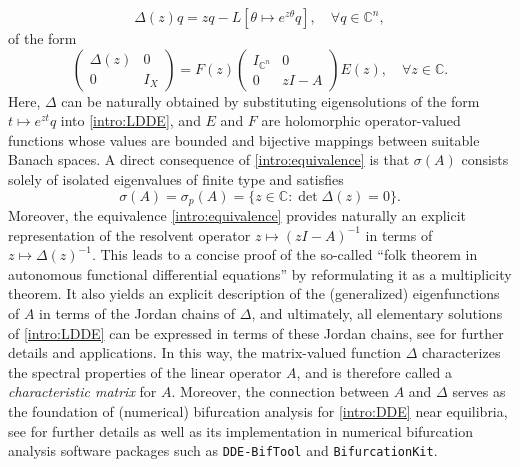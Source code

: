 \documentclass[english]{myarticle}
\begin{document}
\begin{sloppypar}
\begin{equation}
    \Delta(z)q = zq - L[\theta  \mapsto e^{z \theta}q], \quad \forall q \in \mathbb{C}^n,
\end{equation}
of the form
\begin{equation} \label{intro:equivalence}
        \begin{pmatrix}
            \Delta(z) & 0 \\
            0 & I_{X}
        \end{pmatrix}
        =
        F(z)
        \begin{pmatrix}
            I_{\mathbb{C}^n}& 0 \\
            0 & zI - A
        \end{pmatrix}
        E(z), \quad \forall z \in \mathbb{C}.
\end{equation}
Here, $\Delta$ can be naturally obtained by substituting eigensolutions of the form $t \mapsto e^{zt}q$ into \eqref{intro:LDDE}, and $E$ and $F$ are holomorphic operator-valued functions whose values are bounded and bijective mappings between suitable Banach spaces. A direct consequence of \eqref{intro:equivalence} is that $\sigma(A)$ consists solely of isolated eigenvalues of finite type and satisfies
\begin{equation} \label{intro:spectraDDE}
    \sigma(A) = \sigma_p(A) = \{ z \in \mathbb{C} : \det \Delta(z) = 0 \}.
\end{equation}
Moreover, the equivalence \eqref{intro:equivalence} provides naturally an explicit representation of the resolvent operator $z \mapsto (zI - A)^{-1}$ in terms of $z \mapsto \Delta(z)^{-1}$. This leads to a concise proof of the so-called ``folk theorem in autonomous functional differential equations'' by reformulating it as a multiplicity theorem. It also yields an explicit description of the (generalized) eigenfunctions of $A$ in terms of the Jordan chains of $\Delta$, and ultimately, all elementary solutions of \eqref{intro:LDDE} can be expressed in terms of these Jordan chains, see \cite{Kaashoek1992,Hale1993,Diekmann1995} for further details and applications. In this way, the matrix-valued function $\Delta$ characterizes the spectral properties of the linear operator $A$, and is therefore called a \emph{characteristic matrix} for $A$. Moreover, the connection between $A$ and $\Delta$ serves as the foundation of (numerical) bifurcation analysis for \eqref{intro:DDE} near equilibria, see \cite{Bosschaert2020,Bosschaert2024a,Janssens2010,Diekmann1995} for further details as well as its implementation in numerical bifurcation analysis software packages such as \verb|DDE-BifTool| \cite{Sieber2014,Engelborghs2002,Krauskopf2022} and \verb|BifurcationKit|.


\end{sloppypar}
\end{document}
